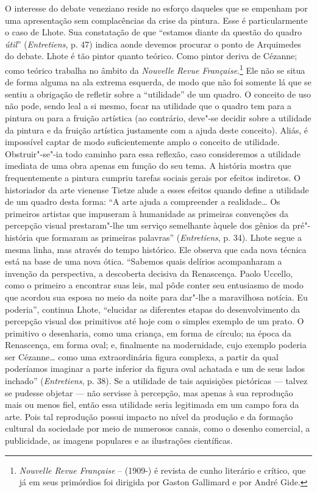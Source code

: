 O interesse do debate veneziano reside no esforço daqueles que se empenham por
uma apresentação sem complacências da crise da pintura. Esse é particularmente o caso
de Lhote. Sua constatação de que ``estamos diante da questão do quadro
\emph{útil}'' (\emph{Entretiens}, p. 47) indica aonde devemos
procurar o ponto de Arquimedes do debate. Lhote é tão pintor quanto
teórico. Como pintor deriva de Cézanne; como teórico trabalha no âmbito
da \emph{Nouvelle Revue Française}.\footnote{\emph{Nouvelle Revue
  Française} --  (1909-) é revista de cunho literário e
  crítico, que já em seus primórdios foi dirigida por Gaston Gallimard e
  por André Gide. \versal{[N.~E.]}} Ele não se situa de forma alguma na ala extrema
esquerda, de modo que não foi somente lá que se sentiu a obrigação de refletir sobre
a ``utilidade'' de um quadro. O conceito de uso não pode, sendo leal a si
mesmo, focar na utilidade que o quadro tem para a pintura ou para a
fruição artística (ao contrário, deve"-se decidir sobre a utilidade da pintura e da fruição artística justamente com a ajuda deste conceito). Aliás, é impossível captar de modo
suficientemente amplo o conceito de utilidade. Obstruir"-se"-ia todo
caminho para essa reflexão, caso consideremos a utilidade imediata de uma
obra apenas em função do seu tema. A história mostra que frequentemente a pintura
cumpriu tarefas sociais gerais por efeitos indiretos.
O historiador da arte vienense Tietze alude a esses efeitos quando define
a utilidade de um quadro desta forma: ``A arte ajuda a compreender a realidade\ldots{}
Os primeiros artistas que impuseram à humanidade as primeiras convenções
da percepção visual prestaram"-lhe um serviço semelhante àquele dos
gênios da pré"-história que formaram as primeiras palavras''
(\emph{Entretiens}, p. 34). Lhote segue a mesma linha, mas através do tempo
histórico. Ele observa que cada nova técnica está na base de uma nova
ótica. ``Sabemos quais delírios acompanharam a invenção da perspectiva,
a descoberta decisiva da Renascença. Paolo Uccello, como o primeiro a
encontrar suas leis, mal pôde conter seu entusiasmo de modo que acordou
sua esposa no meio da noite para dar"-lhe a maravilhosa notícia. Eu
poderia'', continua Lhote, ``elucidar as diferentes etapas do
desenvolvimento da percepção visual dos primitivos até hoje com o
simples exemplo de um prato. O primitivo o desenharia, como uma
criança, em forma de círculo; na época da Renascença, em forma oval; e,
finalmente na modernidade, cujo exemplo poderia ser Cézanne\ldots{} como
uma extraordinária figura complexa, a partir da qual poderíamos
imaginar a parte inferior da figura oval achatada e um de seus lados
inchado'' (\emph{Entretiens}, p. 38). Se a utilidade de tais aquisições
pictóricas --- talvez se pudesse objetar --- não servisse à percepção, mas
apenas à sua reprodução mais ou menos fiel, então essa utilidade seria
legitimada em um campo fora da arte. Pois tal reprodução
possui impacto no nível da produção e da formação cultural da sociedade
por meio de numerosos canais, como o desenho comercial, a
publicidade, as imagens populares e as ilustrações científicas.

